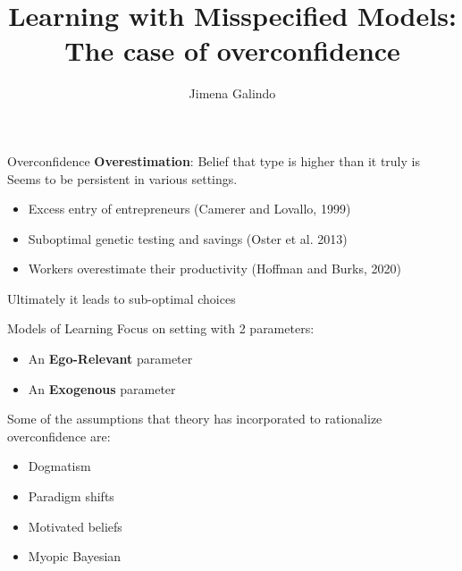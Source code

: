 \documentclass[aspectratio=169]{beamer}
\title{Learning with Misspecified Models:\\  
The case of overconfidence}
\author{Jimena Galindo}
\begin{document}
\frame{\titlepage}

\begin{frame}{Overconfidence}
    \textbf{Overestimation}: Belief that type is higher than it truly is\\
    \bigskip
    \pause
    Seems to be persistent in various settings. 
    \begin{itemize} 
        \item Excess entry of entrepreneurs (Camerer and Lovallo, 1999)
        \item Suboptimal genetic testing and savings (Oster et al. 2013)
        \item  Workers overestimate their productivity (Hoffman and Burks, 2020)
    \end{itemize}
    \bigskip
    \alert{Ultimately it leads to sub-optimal choices}
    
\end{frame}

\begin{frame}{Models of Learning}
    Focus on setting with 2 parameters:
    \begin{itemize}
        \item An \alert{\textbf{Ego-Relevant}} parameter
        \item An \alert{\textbf{Exogenous}} parameter
    \end{itemize}
    \bigskip
    Some of the assumptions that theory has incorporated to rationalize overconfidence are:
    \begin{itemize}
        \item Dogmatism
        \item Paradigm shifts
        \item Motivated beliefs
        \item Myopic Bayesian
    \end{itemize}
\end{frame}
\end{document}
